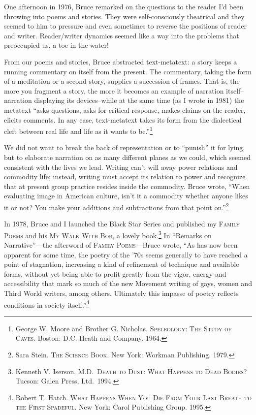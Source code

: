 \documentclass[
]{memoir}
\begin{document}
One afternoon in 1976, Bruce remarked on the questions to the reader I'd
been throwing into poems and stories. They were self-consciously
theatrical and they seemed to him to pressure and even sometimes to
reverse the positions of reader and writer. Reader/writer dynamics
seemed like a way into the problems that preoccupied us, a toe in the
water!

From our poems and stories, Bruce abstracted text-metatext: a story
keeps a running commentary on itself from the present. The commentary,
taking the form of a meditation or a second story, supplies a succession
of frames. That is, the more you fragment a story, the more it becomes
an example of narration itself--narration displaying its devices--while
at the same time (as I wrote in 1981) the metatext ``asks questions,
asks for critical response, makes claims on the reader, elicits
comments. In any case, text-metatext takes its form from the dialectical
cleft between real life and life as it wants to be.''\footnote{George W.
  Moore and Brother G. Nicholas. \textsc{Speleology: The Study of
  Caves}. Boston: D.C. Heath and Company. 1964.}

We did not want to break the back of representation or to ``punish'' it
for lying, but to elaborate narration on as many different planes as we
could, which seemed consistent with the lives we lead. Writing can't
will away power relations and commodity life; instead, writing must
accept its relation to power and recognize that at present group
practice resides inside the commodity. Bruce wrote, ``When evaluating
image in American culture, isn't it a commodity whether anyone likes it
or not? You make your additions and subtractions from that point
on.''\footnote{Sara Stein. \textsc{The Science Book}. New York: Workman
  Publishing. 1979.}

In 1978, Bruce and I launched the Black Star Series and published my
\textsc{Family Poems} and his \textsc{My Walk With Bob}, a lovely
book.\footnote{Kenneth V. Iserson, M.D.~\textsc{Death to Dust: What
  Happens to Dead Bodies?} Tucson: Galen Press, Ltd.~1994.} In ``Remarks
on Narrative''---the afterword of \textsc{Family Poems}---Bruce wrote,
``As has now been apparent for some time, the poetry of the '70s seems
generally to have reached a point of stagnation, increasing a kind of
refinement of technique and available forms, without yet being able to
profit greatly from the vigor, energy and accessibility that mark so
much of the new Movement writing of gays, women and Third World writers,
among others. Ultimately this impasse of poetry reflects conditions in
society itself.''\footnote{Robert T. Hatch. \textsc{What Happens When
  You Die From Your Last Breath to the First Spadeful}. New York: Carol
  Publishing Group. 1995.}
\end{document}
